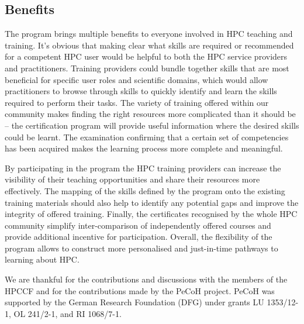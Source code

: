 \documentclass[jocse]{jocseart}
\newcommand{\jk}[1]{\todo[inline]{JK: #1}}
\begin{document}
\subsection{Benefits}

The program brings multiple benefits to everyone involved in HPC teaching and training. It's obvious that making clear what skills are required or recommended for a competent HPC user would be helpful to both the HPC service providers and practitioners. Training providers could bundle together skills that are most beneficial for specific user roles and scientific domains, which would allow practitioners to browse through skills to quickly identify and learn the skills required to perform their tasks. The variety of training offered within our community makes finding the right resources more complicated than it should be -- the certification program will provide useful information where the desired skills could be learnt. The examination confirming that a certain set of competencies has been acquired makes the learning process more complete and meaningful.  

By participating in the program the HPC training providers can increase the visibility of their teaching opportunities and share their resources more effectively. 
The mapping of the skills defined by the program onto the existing training materials should also help to identify any potential gaps and improve the integrity of offered training. 
Finally, the certificates recognised by the whole HPC community simplify inter-comparison of independently offered courses and provide additional incentive for participation.
Overall, the flexibility of the program allows to construct more personalised and just-in-time pathways to learning about HPC.  


\appendix

\begin{acks}
\small
We are thankful for the contributions and discussions with the members of the HPCCF and for the contributions made by the PeCoH project.
\jk{TODO}
PeCoH was supported by the German Research Foundation (DFG) under grants LU 1353/12-1, OL 241/2-1, and RI 1068/7-1.
\end{acks}



\end{document}
